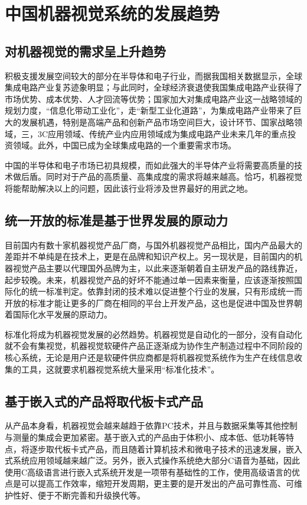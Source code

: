 {\section{中国机器视觉系统的发展趋势}
\subsection{对机器视觉的需求呈上升趋势 } 
积极支援发展空间较大的部分在半导体和电子行业，而据我国相关数据显示，全球集成电路产业复苏迹象明显；与此同时，全球经济衰退使我国集成电路产业获得了市场优势、成本优势、人才回流等优势；国家加大对集成电路产业这一战略领域的规划力度，“信息化带动工业化”，走“新型工业化道路”，为集成电路产业带来了巨大的发展机遇，特别是高端产品和创新产品市场空间巨大，设计环节、国家战略领域，三，3C应用领域、传统产业内应用领域成为集成电路产业未来几年的重点投资领域。此外，中国已成为全球集成电路的一个重要需求市场。  

中国的半导体和电子市场已初具规模，而如此强大的半导体产业将需要高质量的技术做后盾。同时对于产品的高质量、高集成度的需求将越来越高。恰巧，机器视觉将能帮助解决以上的问题，因此该行业将涉及世界最好的用武之地。  
\subsection{统一开放的标准是基于世界发展的原动力  }
目前国内有数十家机器视觉产品厂商，与国外机器视觉产品相比，国内产品最大的差距并不单纯是在技术上，更是在品牌和知识产权上。另一现状是，目前国内的机器视觉产品主要以代理国外品牌为主，以此来逐渐朝着自主研发产品的路线靠近，起步较晚。未来，机器视觉产品的好坏不能通过单一因素来衡量，应该逐渐按照国际化的统一标准判定。依靠封闭的技术难以促进整个行业的发展，只有形成统一而开放的标准才能让更多的厂商在相同的平台上开发产品，这也是促进中国及世界朝着国际化水平发展的原动力。  

标准化将成为机器视觉发展的必然趋势。机器视觉是自动化的一部分，没有自动化就不会有集视觉，机器视觉软硬件产品正逐渐成为协作生产制造过程中不同阶段的核心系统，无论是用户还是软硬件供应商都是将机器视觉系统作为生产在线信息收集的工具，这就要求机器视觉系统大量采用“标准化技术”。  
\subsection{基于嵌入式的产品将取代板卡式产品 } 
从产品本身看，机器视觉会越来越趋于依靠PC技术，并且与数据采集等其他控制与测量的集成会更加紧密。基于嵌入式的产品由于体积小、成本低、低功耗等特点，将逐步取代板卡式产品，而且随着计算机技术和微电子技术的迅速发展，嵌入式系统应用领域越来越广泛。另外，嵌入式操作系统绝大部分C语音为基础，因此使用C高级语言进行嵌入式系统开发是一项带有基础性的工作，使用高级语言的优点是可以提高工作效率，缩短开发周期，更主要的是开发出的产品可靠性高、可维护性好、便于不断完善和升级换代等。  
}
